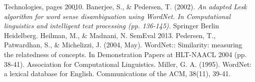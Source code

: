 \documentclass[a4paper]{article}
\begin{document}
\begin{thebibliography}{10}
Technologies, pages 200ֲ10.
 Banerjee, S., \& Pedersen, T. (2002). \textit{An adapted Lesk algorithm for word sense disambiguation using WordNet. In Computational linguistics and intelligent text processing (pp. 136-145).} Springer Berlin Heidelberg.
  Heilman, M., \& Madnani, N.  SemEval 2013.
 Pedersen, T., Patwardhan, S., \& Michelizzi, J. (2004, May). WordNet:: Similarity: measuring the relatedness of concepts. In Demonstration Papers at HLT-NAACL 2004 (pp. 38-41). Association for Computational Linguistics.
 Miller, G. A. (1995). WordNet: a lexical database for English. Communications of the ACM, 38(11), 39-41.
\end{thebibliography}
\end{document}
